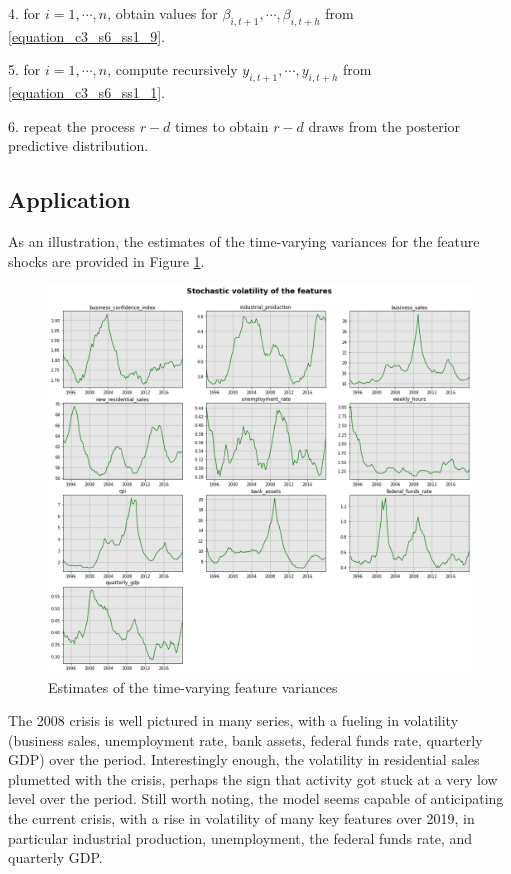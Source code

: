 4. for $i=1,\cdots, n$, obtain values for $\beta_{i,t+1}, \cdots, \beta_{i,t+h}$ from \ref{equation_c3_s6_ss1_9}.

5. for $i=1,\cdots, n$, compute recursively $y_{i, t+1}, \cdots, y_{i, t+h}$ from \ref{equation_c3_s6_ss1_1}.

6. repeat the process $r-d$ times to obtain $r-d$ draws from the posterior predictive distribution.

\newpage

\subsection{Application}
\label{chapter3_section6_subsection4}


As an illustration, the estimates of the time-varying variances for the feature shocks are provided in Figure \ref{fig_c3_s6_ss4_1}. \vspace{-5mm}

\begin{figure}[H]
\centering
\includegraphics[scale=0.44]{images/stochastic_volatility.png}
\caption{Estimates of the time-varying feature variances}
\label{fig_c3_s6_ss4_1} \vspace{-5mm}
\end{figure}

The 2008 crisis is well pictured in many series, with a fueling in volatility (business sales, unemployment rate, bank assets, federal funds rate, quarterly GDP) over the period. Interestingly enough, the volatility in residential sales plumetted with the crisis, perhaps the sign that activity got stuck at a very low level over the period. Still worth noting, the model seems capable of anticipating the current crisis, with a rise in volatility of many key features over 2019, in particular industrial production, unemployment, the federal funds rate, and quarterly GDP.



\newpage

